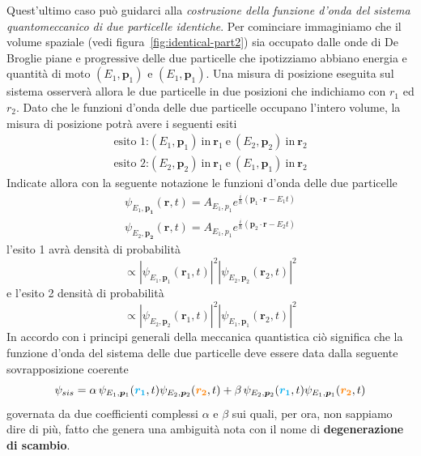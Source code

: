 Quest’ultimo caso può guidarci alla \emph{costruzione della funzione d’onda del sistema quantomeccanico di due particelle identiche}.
Per cominciare immaginiamo che il volume spaziale (vedi figura~\ref{fig:identical-part2}) sia occupato dalle onde di De Broglie piane e progressive delle due particelle che ipotizziamo abbiano energia e quantità di moto $(E_{1},\mathbf{p}_{1})$ e $(E_{1},\mathbf{p}_{1})$. Una misura di posizione eseguita sul sistema osserverà allora le due particelle in due posizioni che indichiamo con $r_{1}$ ed $r_{2}$. Dato che le funzioni d’onda delle due particelle occupano l’intero volume, la misura di posizione potrà avere i seguenti esiti
\begin{gather*}
    \text{esito 1:} (E_{1}, \mathbf{p}_{1}) \ \text{in} \ \mathbf{r}_{1} \ \text{e} \ (E_{2}, \mathbf{p}_{2}) \ \text{in} \ \mathbf{r}_{2}\\
    \text{esito 2:} (E_{2}, \mathbf{p}_{2}) \ \text{in} \ \mathbf{r}_{1} \ \text{e} \ (E_{1}, \mathbf{p}_{1}) \ \text{in} \ \mathbf{r}_{2}
\end{gather*}
Indicate allora con la seguente notazione le funzioni d’onda delle due particelle
\begin{gather*}
    \psi_{E_{1},\mathbf{{p}_{1}}}(\mathbf{{r}},t) = A_{E_{1},\mathbf{}{p}_{1}}e^{ \frac{i}{\hbar} (\mathbf{{p}}_{1} \cdot \mathbf{{r}}-E_{1}t)}\\
    \psi_{E_{2},\mathbf{{p}_{2}}}(\mathbf{{r}},t) = A_{E_{1},\mathbf{}{p}_{1}}e^{ \frac{i}{\hbar} (\mathbf{{p}}_{2} \cdot \mathbf{{r}}-E_{2}t)}
\end{gather*}
l’esito 1 avrà densità di probabilità
\[
\propto | \psi_{E_{1},\mathbf{p}_{1}}(\mathbf{r}_{1},t)|^{2} | \psi_{E_{2},\mathbf{p}_{2}}(\mathbf{r}_{2},t)|^{2}
\]
e l’esito 2 densità di probabilità
\[
\propto | \psi_{E_{2},\mathbf{p}_{2}}(\mathbf{r}_{1},t)|^{2} | \psi_{E_{1},\mathbf{p}_{1}}(\mathbf{r}_{2},t)|^{2}
\]
In accordo con i principi generali della meccanica quantistica ciò significa che la funzione d’onda del sistema delle due particelle deve essere data dalla seguente sovrapposizione coerente
\begin{equation}
    \psi_{sis} = \alpha \, \psi_{E_{1},\bm{p}_{1}}(\textcolor{cyan}{\bm{r_1}},t) \psi_{E_{2},\bm{p}_{2}}(\textcolor{orange}{\bm{r_2}},t) +
    \beta \, \psi_{E_{2},\bm{p}_{2}}(\textcolor{cyan}{\bm{r_1}},t) \psi_{E_{1},\bm{p}_{1}}(\textcolor{orange}{\bm{r_2}},t)
    \label{eq:total-system-wave-function-identical-particles}
\end{equation}
governata da due coefficienti complessi $\alpha$ e $\beta$ sui quali, per ora, non sappiamo dire di più, fatto che genera una ambiguità nota con il nome di \textbf{degenerazione di scambio}.
\bigskip

